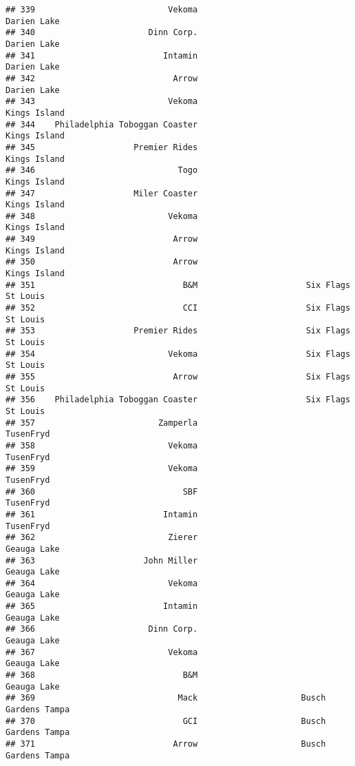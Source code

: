 \documentclass[
]{article}
\begin{document}
\begin{verbatim}
## 339                           Vekoma                             Darien Lake
## 340                       Dinn Corp.                             Darien Lake
## 341                          Intamin                             Darien Lake
## 342                            Arrow                             Darien Lake
## 343                           Vekoma                            Kings Island
## 344    Philadelphia Toboggan Coaster                            Kings Island
## 345                    Premier Rides                            Kings Island
## 346                             Togo                            Kings Island
## 347                    Miler Coaster                            Kings Island
## 348                           Vekoma                            Kings Island
## 349                            Arrow                            Kings Island
## 350                            Arrow                            Kings Island
## 351                              B&M                      Six Flags St Louis
## 352                              CCI                      Six Flags St Louis
## 353                    Premier Rides                      Six Flags St Louis
## 354                           Vekoma                      Six Flags St Louis
## 355                            Arrow                      Six Flags St Louis
## 356    Philadelphia Toboggan Coaster                      Six Flags St Louis
## 357                         Zamperla                               TusenFryd
## 358                           Vekoma                               TusenFryd
## 359                           Vekoma                               TusenFryd
## 360                              SBF                               TusenFryd
## 361                          Intamin                               TusenFryd
## 362                           Zierer                             Geauga Lake
## 363                      John Miller                             Geauga Lake
## 364                           Vekoma                             Geauga Lake
## 365                          Intamin                             Geauga Lake
## 366                       Dinn Corp.                             Geauga Lake
## 367                           Vekoma                             Geauga Lake
## 368                              B&M                             Geauga Lake
## 369                             Mack                     Busch Gardens Tampa
## 370                              GCI                     Busch Gardens Tampa
## 371                            Arrow                     Busch Gardens Tampa

\end{verbatim}
\end{document}
